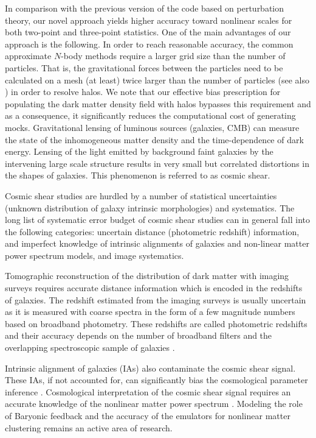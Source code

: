 In comparison with the previous version of the code based on perturbation theory, our novel approach yields higher accuracy toward nonlinear scales for both two-point 
and three-point statistics. One of the main advantages of our approach is the following. In order to reach reasonable accuracy, the common approximate $N$-body methods \citep{qpm,fastpm,ice_cola} require a larger grid size than the number of particles. That is, the gravitational forces between the particles need to be calculated on a mesh (at least) twice larger than the number of particles (see also \citealt{nifty,monaco2016}) in order to resolve halos. We note that our effective bias prescription for populating the dark matter density field with halos bypasses this requirement and as a consequence, it significantly reduces the computational cost of generating mocks.      
Gravitational lensing of luminous sources (galaxies, CMB) can measure 
the state of the inhomogeneous matter density and the time-dependence of dark energy. 
Lensing of the light emitted by background faint galaxies by the intervening large scale structure 
results in very small but correlated distortions in the shapes of galaxies. This phenomenon is referred to 
as cosmic shear.

Cosmic shear studies are hurdled by a number of statistical uncertainties (unknown distribution 
of galaxy intrinsic morphologies) and systematics. The long list of systematic error budget 
of cosmic shear studies can in general fall into the following categories: uncertain distance 
(photometric redshift) information, and imperfect knowledge of intrinsic alignments of galaxies and non-linear matter 
power spectrum models, and image systematics. 

Tomographic reconstruction of the distribution of dark matter with imaging surveys requires 
accurate distance information which is encoded in the redshifts of galaxies. 
The redshift estimated from the imaging surveys is usually uncertain as it is measured with coarse 
spectra in the form of a few magnitude numbers based on broadband photometry. These redshifts are called 
photometric redshifts and their accuracy depends on the number of broadband filters and the overlapping spectroscopic 
sample of galaxies \citep{bonnett2016,choi2016,boris2016,hildebrandt2017}. %

Intrinsic alignment of galaxies (IAs) also contaminate the cosmic shear signal. These IAs, if not accounted for, 
can significantly bias the cosmological parameter inference \citep{codis2015,joachimi2015, kirk2015,krause_ia}. 
Cosmological interpretation of the cosmic shear signal requires an accurate knowledge of the nonlinear 
matter power spectrum \citep{semboloni2013, eifler2015, schaye2015, joudaki2016, kitching2016, mead2016}. Modeling the role of 
Baryonic feedback and the accuracy of the emulators for nonlinear matter clustering remains an active area of research. 

